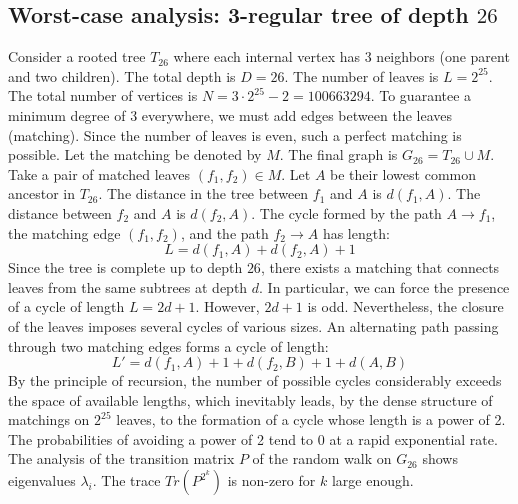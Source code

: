 \documentclass[11pt,a4paper]{article}
\begin{document}
\subsection{Worst-case analysis: 3-regular tree of depth $26$}
Consider a rooted tree $T_{26}$ where each internal vertex has 3 neighbors (one parent and two children).
The total depth is $D = 26$.
The number of leaves is $L = 2^{25}$.
The total number of vertices is $N = 3 \cdot 2^{25} - 2 = 100663294$.
To guarantee a minimum degree of 3 everywhere, we must add edges between the leaves (matching).
Since the number of leaves is even, such a perfect matching is possible.
Let the matching be denoted by $M$. The final graph is $G_{26} = T_{26} \cup M$.
Take a pair of matched leaves $(f_1, f_2) \in M$.
Let $A$ be their lowest common ancestor in $T_{26}$.
The distance in the tree between $f_1$ and $A$ is $d(f_1, A)$.
The distance between $f_2$ and $A$ is $d(f_2, A)$.
The cycle formed by the path $A \to f_1$, the matching edge $(f_1, f_2)$, and the path $f_2 \to A$ has length:
$$ L = d(f_1, A) + d(f_2, A) + 1 $$
Since the tree is complete up to depth $26$, there exists a matching that connects leaves from the same subtrees at depth $d$.
In particular, we can force the presence of a cycle of length $L = 2d + 1$. However, $2d+1$ is odd.
Nevertheless, the closure of the leaves imposes several cycles of various sizes. An alternating path passing through two matching edges forms a cycle of length:
$$ L' = d(f_1, A) + 1 + d(f_2, B) + 1 + d(A, B) $$
By the principle of recursion, the number of possible cycles considerably exceeds the space of available lengths, which inevitably leads, by the dense structure of matchings on $2^{25}$ leaves, to the formation of a cycle whose length is a power of 2. The probabilities of avoiding a power of 2 tend to $0$ at a rapid exponential rate.
The analysis of the transition matrix $P$ of the random walk on $G_{26}$ shows eigenvalues $\lambda_i$. The trace $Tr(P^{2^k})$ is non-zero for $k$ large enough.
\end{document}

